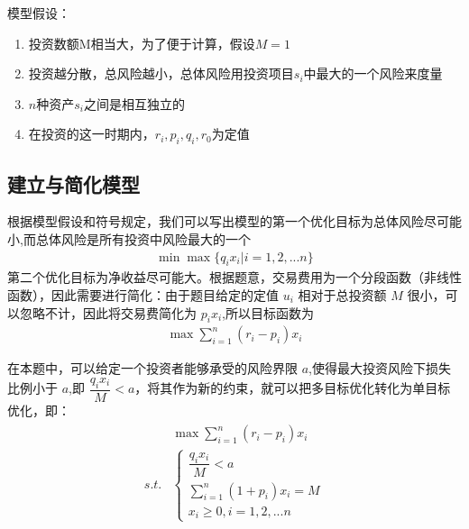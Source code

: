 \documentclass[letterpaper,10pt,english]{sphinxmanual}
\begin{document}
模型假设：
\begin{enumerate}
%
\item {} 
投资数额M相当大，为了便于计算，假设\(M=1\)

\item {} 
投资越分散，总风险越小，总体风险用投资项目\(s_i\)中最大的一个风险来度量

\item {} 
\(n\)种资产\(s_i\)之间是相互独立的

\item {} 
在投资的这一时期内，\(r_i,p_i,q_i,r_0\)为定值

\end{enumerate}


\subsection{建立与简化模型}
\label{\detokenize{docs/LP:id14}}
根据模型假设和符号规定，我们可以写出模型的第一个优化目标为总体风险尽可能小,而总体风险是所有投资中风险最大的一个
\begin{equation*}
\begin{split}
\min \max \{q_ix_i | i=1,2,...n\}
\end{split}
\end{equation*}
第二个优化目标为净收益尽可能大。根据题意，交易费用为一个分段函数（非线性函数），因此需要进行简化：由于题目给定的定值 \(u_i\) 相对于总投资额 \(M\) 很小，可以忽略不计，因此将交易费简化为 \(p_i x_i\),所以目标函数为
\begin{equation*}
\begin{split}
\max \sum_{i=1}^n (r_i - p_i) x_i 
\end{split}
\end{equation*}

在本题中，可以给定一个投资者能够承受的风险界限 \(a\),使得最大投资风险下损失比例小于 \(a\),即 \(\dfrac{q_i x_i}{M} < a\)，将其作为新的约束，就可以把多目标优化转化为单目标优化，即：
\begin{equation*}
\begin{split}
\begin{aligned}
&{\max \sum_{i=1}^n (r_i - p_i) x_i }\\
s.t.&\left\{\begin{array}{ll}
{\dfrac{q_i x_i}{M} < a } \\
{\displaystyle\sum_{i=1}^n (1+p_i)x_i = M} \\
{x_i \geq 0, i=1,2,...n}
\end{array}\right.
\end{aligned}
\end{split}
\end{equation*}
\end{document}

